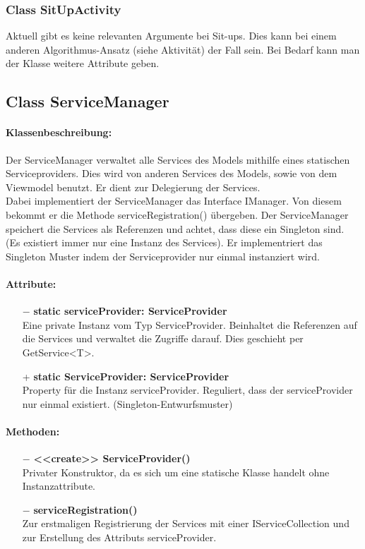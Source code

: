 \documentclass[a4paper,12pt]{article}
\begin{document}
	\subsubsection{Class SitUpActivity}
	Aktuell gibt es keine relevanten Argumente bei Sit-ups. Dies kann bei einem anderen Algorithmus-Ansatz (siehe Aktivität) der Fall sein. Bei Bedarf kann man der Klasse weitere Attribute geben.
	

\subsection{Class ServiceManager}
	\paragraph{Klassenbeschreibung:}
	Der ServiceManager verwaltet alle Services des Models mithilfe eines statischen Serviceproviders. Dies wird von anderen Services des Models, sowie von dem Viewmodel benutzt. Er dient zur Delegierung der Services.\\ 
	Dabei implementiert der ServiceManager das Interface IManager.
	Von diesem bekommt er die Methode serviceRegistration() übergeben.
	Der ServiceManager speichert die Services als Referenzen und achtet, dass diese ein Singleton sind. (Es existiert immer nur eine Instanz des Services).
	Er implementriert das Singleton Muster indem der Serviceprovider nur einmal instanziert wird.
	
	\paragraph{Attribute:}
	\begin{itemize}
		\item[$-$] \textbf{static serviceProvider: ServiceProvider}\\Eine private Instanz vom Typ ServiceProvider. Beinhaltet die Referenzen auf die Services und verwaltet die Zugriffe darauf. Dies geschieht per GetService<T>.
		\item[+] \textbf{static ServiceProvider: ServiceProvider}\\Property für die Instanz serviceProvider. Reguliert, dass der serviceProvider nur einmal existiert. (Singleton-Entwurfsmuster)

	\end{itemize}
	\paragraph{Methoden:}
	\begin{itemize}
		\item[$-$] \textbf{<<create>> ServiceProvider()}\\Privater Konstruktor, da es sich um eine statische Klasse handelt ohne Instanzattribute.
		\item[$-$] \textbf{serviceRegistration()}\\ Zur erstmaligen Registrierung der Services mit einer IServiceCollection und zur Erstellung des Attributs serviceProvider.\\
	\end{itemize}
		
\end{document}
